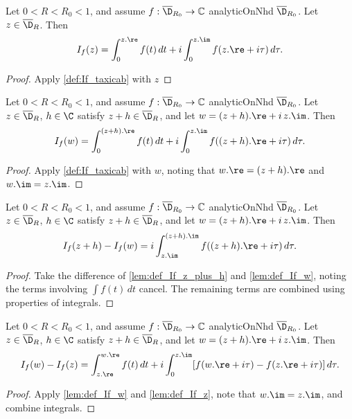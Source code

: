 \begin{lemma} \label{lem:def_If_z}
\leanok
Let $0<R<R_0<1$, and assume $f:\overline{\D}_{R_0}\to\mathbb{C}$ analyticOnNhd $\overline{\D}_{R_0}$. Let $z \in \overline{\D}_R$. Then
\[ I_f(z) = \int_0^{z.\re} f(t)\,dt + i \int_0^{z.\im} f(z.\re + i\tau)\,d\tau. \]
\end{lemma}
\begin{proof}
 \leanok
Apply \cref{def:If_taxicab} with $z$
\end{proof}

\begin{lemma} \label{lem:def_If_w}
\leanok
Let $0<R<R_0<1$, and assume $f:\overline{\D}_{R_0}\to\mathbb{C}$ analyticOnNhd $\overline{\D}_{R_0}$. Let $z \in \overline{\D}_R$, $h\in\C$ satisfy $z+h \in \overline{\D}_R$, and let $w = (z+h).\re + i\,z.\im$. Then
\[ I_f(w) = \int_0^{(z+h).\re} f(t)\,dt + i \int_0^{z.\im} f((z+h).\re + i\tau)\,d\tau. \]
\end{lemma}
\begin{proof}
\leanok
Apply \cref{def:If_taxicab} with $w$, noting that $w.\re = (z+h).\re$ and $w.\im = z.\im$.
\end{proof}

\begin{lemma} \label{lem:diff_If_zh_w}
\leanok
Let $0<R<R_0<1$, and assume $f:\overline{\D}_{R_0}\to\mathbb{C}$ analyticOnNhd $\overline{\D}_{R_0}$. Let $z \in \overline{\D}_R$, $h\in\C$ satisfy $z+h \in \overline{\D}_R$, and let $w = (z+h).\re + i\,z.\im$. Then
\[ I_f(z+h) - I_f(w) = i \int_{z.\im}^{(z+h).\im} f((z+h).\re + i\tau)\,d\tau. \]
\end{lemma}
\begin{proof}
\leanok
Take the difference of \cref{lem:def_If_z_plus_h} and \cref{lem:def_If_w}, noting the terms involving $\int f(t)\,dt$ cancel. The remaining terms are combined using properties of integrals.
\end{proof}


\begin{lemma} \label{lem:diff_If_w_z_initial_form}
\leanok
Let $0<R<R_0<1$, and assume $f:\overline{\D}_{R_0}\to\mathbb{C}$ analyticOnNhd $\overline{\D}_{R_0}$. Let $z \in \overline{\D}_R$, $h\in\C$ satisfy $z+h \in \overline{\D}_R$, and let $w = (z+h).\re + i\,z.\im$. Then
\[ I_f(w) - I_f(z) = \int_{z.\re}^{w.\re} f(t)\,dt + i \int_0^{z.\im} [f(w.\re + i\tau) - f(z.\re + i\tau)]\,d\tau. \]
\end{lemma}
\begin{proof}
\leanok
Apply \cref{lem:def_If_w} and \cref{lem:def_If_z}, note that $w.\im = z.\im$, and combine integrals.
\end{proof}

